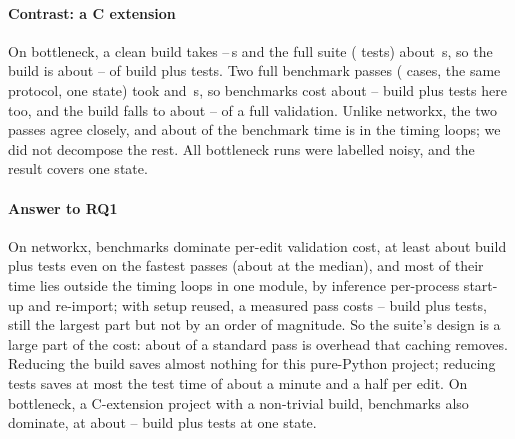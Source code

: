 \paragraph*{Contrast: a C extension}
On bottleneck, a clean build takes \BnBuildLo--\BnBuildHi\,s and the full suite (\BnNumTests{} tests) about \BnTests\,s, so the build is about \BnBuildShareLo--\BnBuildShareHi\pct{} of build plus tests.
Two full benchmark passes (\BnBenchCases{} cases, the same protocol, one state) took \BnBenchPassLo{} and \BnBenchPassHi\,s, so benchmarks cost about \BnBenchRatioLo--\BnBenchRatioHi\x{} build plus tests here too, and the build falls to about \BnBuildShareBenchLo--\BnBuildShareBenchHi\pct{} of a full validation.
Unlike networkx, the two passes agree closely, and about \BnLoopsShare\pct{} of the benchmark time is in the timing loops; we did not decompose the rest.
All bottleneck runs were labelled noisy, and the result covers one state.

\paragraph*{Answer to RQ1}
On networkx, benchmarks dominate per-edit validation cost, at least about \NxBenchRatioTypical\x{} build plus tests even on the fastest passes (about \NxBenchRatioMedian\x{} at the median), and most of their time lies outside the timing loops in one module, by inference per-process start-up and re-import; with setup reused, a measured pass costs \ECachedRatioLo--\ECachedRatioHi\x{} build plus tests, still the largest part but not by an order of magnitude.
So the suite's design is a large part of the cost: about \EStdOverCached\x{} of a standard pass is overhead that caching removes.
Reducing the build saves almost nothing for this pure-Python project; reducing tests saves at most the test time of about a minute and a half per edit.
On bottleneck, a C-extension project with a non-trivial build, benchmarks also dominate, at about \BnBenchRatioLo--\BnBenchRatioHi\x{} build plus tests at one state.
